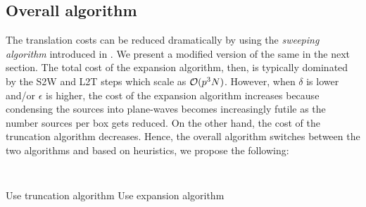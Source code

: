 \subsection{Overall algorithm} 
The translation costs can be reduced dramatically by using the {\em sweeping algorithm} introduced in \cite{greengard98}. We present a modified version of the same in the next section. The total cost of the expansion algorithm, then, is typically dominated by the S2W and L2T steps which scale as $\mathcal{O}(p^3 N)$. However, when $\delta$ is lower and/or $\epsilon$ is higher, the cost of the expansion algorithm increases because condensing the sources into plane-waves becomes increasingly futile as the number sources per box gets reduced. On the other hand, the cost of the truncation algorithm decreases. Hence, the overall algorithm switches between the two algorithms and based on heuristics, we propose the following:

{\tt
\begin{algorithmic}
\STATE
     \STATE Use truncation algorithm 
  \ELSE 
     \STATE Use expansion algorithm
  \ENDIF
\STATE
\end{algorithmic}
}


